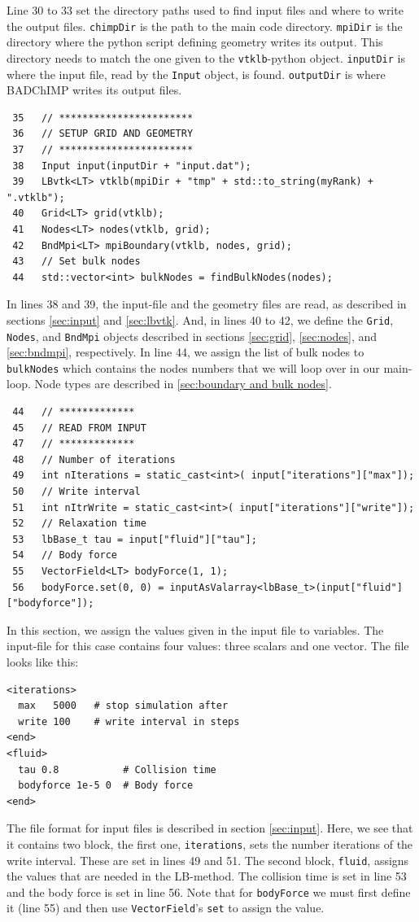 \documentclass[11pt,a4paper]{report}
\begin{document}
Line 30 to 33 set the directory paths used to find input files and where to write the output files. \texttt{chimpDir} is the path to the main code directory. \texttt{mpiDir} is the directory where the python script defining geometry writes its output. This directory needs to match the one given to the \texttt{vtklb}-python object. \texttt{inputDir} is where the input file, read by the \texttt{Input} object, is found. \texttt{outputDir} is where BADChIMP writes its output files.
\begin{verbatim}
 35   // ***********************
 36   // SETUP GRID AND GEOMETRY
 37   // ***********************
 38   Input input(inputDir + "input.dat");
 39   LBvtk<LT> vtklb(mpiDir + "tmp" + std::to_string(myRank) + ".vtklb");
 40   Grid<LT> grid(vtklb);
 41   Nodes<LT> nodes(vtklb, grid);
 42   BndMpi<LT> mpiBoundary(vtklb, nodes, grid);
 43   // Set bulk nodes
 44   std::vector<int> bulkNodes = findBulkNodes(nodes);
\end{verbatim}
In lines 38 and 39, the input-file and the geometry files are read, as described in sections \ref{sec:input} and \ref{sec:lbvtk}.  And, in lines 40 to 42, we define the \texttt{Grid}, \texttt{Nodes}, and \texttt{BndMpi} objects described in sections \ref{sec:grid}, \ref{sec:nodes}, and \ref{sec:bndmpi}, respectively. In line 44, we assign the list of bulk nodes to \texttt{bulkNodes} which contains the nodes numbers that we will loop over in our main-loop. Node types are described in \ref{sec:boundary and bulk nodes}.
\begin{verbatim}
 44   // *************
 45   // READ FROM INPUT
 47   // *************
 48   // Number of iterations
 49   int nIterations = static_cast<int>( input["iterations"]["max"]);
 50   // Write interval
 51   int nItrWrite = static_cast<int>( input["iterations"]["write"]);
 52   // Relaxation time
 53   lbBase_t tau = input["fluid"]["tau"];
 54   // Body force
 55   VectorField<LT> bodyForce(1, 1);
 56   bodyForce.set(0, 0) = inputAsValarray<lbBase_t>(input["fluid"]["bodyforce"]);
\end{verbatim}
In this section, we assign the values given in the input file to variables. The input-file for this case contains four values: three scalars and one vector. The file looks like this:
\begin{verbatim}
<iterations>
  max   5000   # stop simulation after
  write 100    # write interval in steps
<end>
<fluid>
  tau 0.8           # Collision time
  bodyforce 1e-5 0  # Body force
<end>
\end{verbatim}
The file format for input files is described in section \ref{sec:input}. Here, we see that it contains two block, the first one, \texttt{iterations}, sets the number iterations of the write interval. These are set in lines 49 and 51. The second block, \texttt{fluid}, assigns the values that are needed in the LB-method. The collision time is set in line 53 and the body force is set in line 56. Note that for \texttt{bodyForce} we must first define it (line 55) and then use \texttt{VectorField}'s \texttt{set} to assign the value.  
\end{document}
